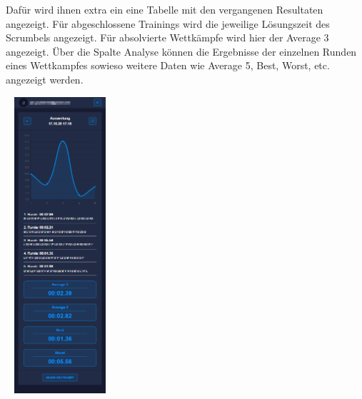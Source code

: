\documentclass[a4paper]{article}
\theoremstyle{definition}
\begin{document}
Dafür wird ihnen extra ein eine Tabelle mit den vergangenen Resultaten angezeigt. Für abgeschlossene Trainings wird die jeweilige Lösungszeit des Scrumbels angezeigt. Für absolvierte Wettkämpfe wird hier der Average 3 angezeigt. Über die Spalte Analyse können die Ergebnisse der einzelnen Runden eines Wettkampfes sowieso weitere Daten wie Average 5, Best, Worst, etc. angezeigt werden.
\begin{center}
	\includegraphics[width= 4cm, height=11cm]{img/competitiondetails}
\end{center}
\newpage
\end{document}
